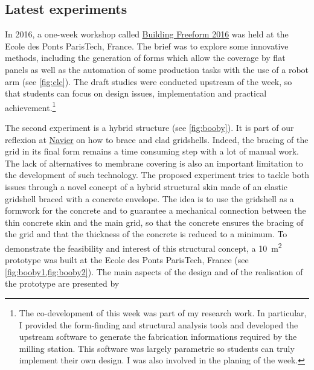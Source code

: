 \subsection{Latest experiments}

In 2016, a one-week workshop called \href{http://thinkshell.fr/freeform-wooden-gridshell-2016/}{Building Freeform 2016} was held at the Ecole des Ponts ParisTech, France. The brief was to explore some innovative methods, including the generation of forms which allow the coverage by flat panels as well as the automation of some production tasks with the use of a robot arm (see \cref{fig:clc}). The draft studies were conducted upstream of the week, so that students can focus on design issues, implementation and practical achievement.\footnote{The co-development of this week was part of my research work. In particular, I provided the form-finding and structural analysis tools and developed the upstream software to generate the fabrication informations required by the milling station. This software was largely parametric so students can truly implement their own design. I was also involved in the planing of the week.}

The second experiment is a hybrid structure (see \cref{fig:booby}). It is part of our reflexion at \href{http://navier.enpc.fr}{Navier} on how to brace and clad gridshells. Indeed, the bracing of the grid in its final form remains a time consuming step with a lot of manual work. The lack of alternatives to membrane covering is also an important limitation to the development of such technology. The proposed experiment tries to tackle both issues through a novel concept of a hybrid structural skin made of an elastic gridshell braced with a concrete envelope. The idea is to use the gridshell as a formwork for the concrete and to guarantee a mechanical connection between the thin concrete skin and the main grid, so that the concrete ensures the bracing of the grid and that the thickness of the concrete is reduced to a minimum. To demonstrate the feasibility and interest of this structural concept, a \SI{10}{m^2} prototype was built at the Ecole des Ponts ParisTech, France (see \cref{fig:booby1,fig:booby2}). The main aspects of the design and of the realisation of the prototype are presented by 


